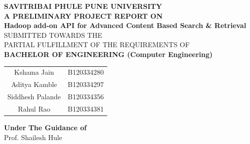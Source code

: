 \documentclass[oneside,a4paper,12pt]{report}
\begin{document}
\setlength{\parindent}{0mm}
\begin{center}
{\bfseries SAVITRIBAI PHULE PUNE UNIVERSITY \\}
 \vspace*{1\baselineskip}
{\bfseries A PRELIMINARY PROJECT REPORT ON \\}
 \vspace*{2\baselineskip}
{\bfseries \fontsize{16}{12} \selectfont Hadoop add-on API for Advanced Content Based Search \& Retrieval \\ \vspace*{2\baselineskip}}
{\fontsize{12}{12} \selectfont SUBMITTED TOWARDS THE
 \\PARTIAL FULFILLMENT OF THE REQUIREMENTS OF \\

\vspace*{2\baselineskip}}
{\bfseries \fontsize{14}{12} \selectfont BACHELOR OF ENGINEERING (Computer
Engineering) \\
\vspace*{1\baselineskip}} 
\begin{tabular}{cc}
Kshama Jain & B120334280 \\
Aditya Kamble & B120334297 \\
Siddhesh Palande & B120334356 \\
Rahul Rao & B120334381 \\[4ex]
\end{tabular}


\textbf{Under The Guidance of} \\[4ex]
Prof. Shailesh Hule \\[4ex]


\end{center}
\end{document}
